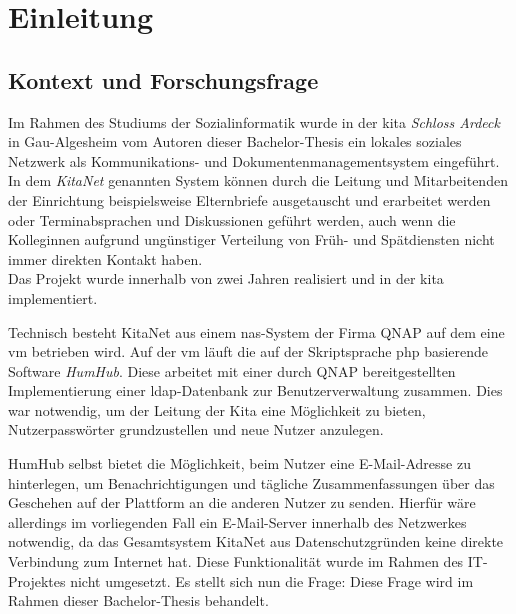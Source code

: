 
\setcounter{page}{1}

\chapter{Einleitung}
\label{sec:Einleitung}
\section{Kontext und Forschungsfrage}
\label{sec:Frage}
Im Rahmen des Studiums der Sozialinformatik wurde in der \ac{kita} \textit{Schloss Ardeck} in Gau-Algesheim vom Autoren dieser Bachelor-Thesis ein lokales soziales Netzwerk als Kommunikations- und Dokumentenmanagementsystem eingeführt. 
In dem \textit{KitaNet} genannten System können durch die Leitung und Mitarbeitenden der Einrichtung beispielsweise Elternbriefe ausgetauscht und erarbeitet werden oder Terminabsprachen und Diskussionen geführt werden, auch wenn die Kolleginnen aufgrund ungünstiger Verteilung von Früh- und Spätdiensten nicht immer direkten Kontakt haben. \\ 
Das Projekt wurde innerhalb von zwei Jahren realisiert und in der \ac{kita} implementiert.

Technisch besteht KitaNet aus einem \ac{nas}-System der Firma QNAP auf dem eine \ac{vm} betrieben wird.
Auf der \ac{vm} läuft die auf der Skriptsprache \ac{php} basierende Software \textit{HumHub}. 
Diese arbeitet mit einer durch QNAP bereitgestellten Implementierung einer \ac{ldap}-Datenbank zur Benutzerverwaltung zusammen. 
Dies war notwendig, um der Leitung der Kita eine Möglichkeit zu bieten, Nutzerpasswörter grundzustellen und neue Nutzer anzulegen.

HumHub selbst bietet die Möglichkeit, beim Nutzer eine E-Mail-Adresse zu hinterlegen, um Benachrichtigungen und tägliche Zusammenfassungen über das Geschehen auf der Plattform an die anderen Nutzer zu senden.
Hierfür wäre allerdings im vorliegenden Fall ein E-Mail-Server innerhalb des Netzwerkes notwendig, da das Gesamtsystem KitaNet aus Datenschutzgründen keine direkte Verbindung zum Internet hat. 
Diese Funktionalität wurde im Rahmen des IT-Projektes nicht umgesetzt. 
Es stellt sich nun die Frage: 
Diese Frage wird im Rahmen dieser Bachelor-Thesis behandelt.



